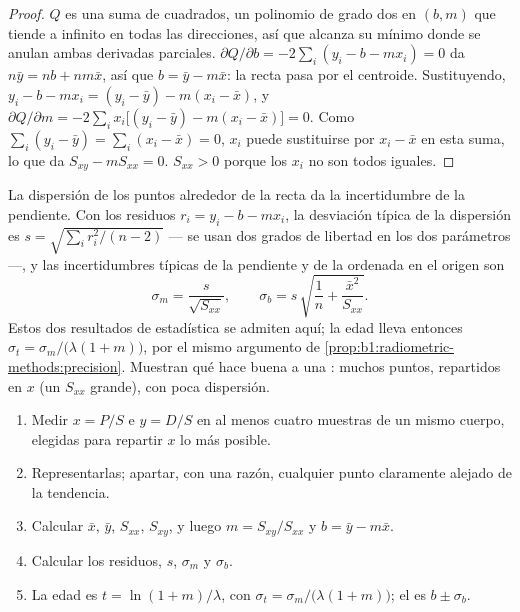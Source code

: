 \begin{proof}
$Q$ es una suma de cuadrados, un polinomio de grado dos en $(b, m)$ que tiende a
infinito en todas las direcciones, así que alcanza su mínimo donde se anulan ambas
derivadas parciales. $\partial Q/\partial b = -2 \sum_i (y_i - b - m x_i) = 0$
da $n\bar y = n b + n m \bar x$, así que $b = \bar y - m \bar x$: la recta pasa
por el centroide. Sustituyendo, $y_i - b - m x_i = (y_i - \bar y) - m(x_i -
\bar x)$, y $\partial Q/\partial m = -2 \sum_i x_i \bigl[(y_i - \bar y) - m(x_i
- \bar x)\bigr] = 0$. Como $\sum_i (y_i - \bar y) = \sum_i (x_i - \bar x) = 0$, $x_i$
puede sustituirse por $x_i - \bar x$ en esta suma, lo que da $S_{xy} - m S_{xx} = 0$.
$S_{xx} > 0$ porque los $x_i$ no son todos iguales.
\end{proof}

La dispersión de los puntos alrededor de la recta da la incertidumbre de la pendiente.
Con los residuos $r_i = y_i - b - m x_i$, la desviación típica de la dispersión es
$s = \sqrt{\sum_i r_i^2/(n-2)}$ --- se usan dos grados de libertad en los dos parámetros ---, y las
incertidumbres típicas de la pendiente y de la ordenada en el origen son
\[
  \sigma_m = \frac{s}{\sqrt{S_{xx}}}, \qquad
  \sigma_b = s\,\sqrt{\frac1n + \frac{\bar x^2}{S_{xx}}} .
\]
Estos dos resultados de estadística se admiten aquí; la edad lleva entonces
$\sigma_t = \sigma_m/\bigl(\lambda(1 + m)\bigr)$, por el mismo argumento de
\cref{prop:b1:radiometric-methods:precision}. Muestran qué hace buena a una : muchos puntos, repartidos en $x$ (un $S_{xx}$ grande), con poca
dispersión.

\begin{method}\label{met:b1:radiometric-methods:isochron}
\begin{enumerate}
  \item Medir $x = P/S$ e $y = D/S$ en al menos cuatro muestras de un mismo cuerpo,
        elegidas para repartir $x$ lo más posible.
  \item Representarlas; apartar, con una razón, cualquier punto claramente alejado de la tendencia.
  \item Calcular $\bar x$, $\bar y$, $S_{xx}$, $S_{xy}$, y luego $m = S_{xy}/S_{xx}$
        y $b = \bar y - m \bar x$.
  \item Calcular los residuos, $s$, $\sigma_m$ y $\sigma_b$.
  \item La edad es $t = \ln(1+m)/\lambda$, con $\sigma_t =
        \sigma_m/\bigl(\lambda(1+m)\bigr)$; el  es $b \pm \sigma_b$.
\end{enumerate}
\end{method}

